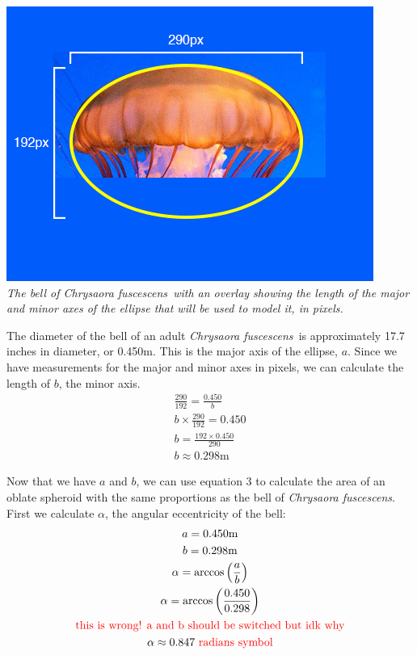 \documentclass[fleqn]{article}
\newcommand{\unit}[1]{\ensuremath{\mathrm{#1}}}
\newcommand\todo[1]{\textcolor{red}{#1}}
\newcommand\chry{\textit{Chrysaora fuscescens}}
\newcommand\chrys{\textit{Chrysaora fuscescens\ }}
\begin{document}
\includegraphics{chrysaora-fuscescens-cropped.png} \\
\textit{\small The bell of \chrys with an overlay showing the length of the major and minor axes of the ellipse that will be used to model it, in pixels.}

The diameter of the bell of an adult \chrys is approximately 17.7 inches in diameter, or 0.450m. This is the major axis of the ellipse, $a$. Since we have measurements for the major and minor axes in pixels, we can calculate the length of $b$, the minor axis.
\begin{gather*}
  \frac{290}{192} = \frac{0.450}{b} \\
  b \times \frac{290}{192} = 0.450 \\
  b = \frac{192 \times 0.450}{290} \\
  b \approx 0.298\unit{m}
\end{gather*}

Now that we have $a$ and $b$, we can use equation 3 to calculate the area of an oblate spheroid with the same proportions as the bell of \chry. First we calculate $\alpha$, the angular eccentricity of the bell:
\begin{gather*}
  a = 0.450\unit{m} \\
  b = 0.298\unit{m} \\
  \alpha=\arccos\left(\frac{a}{b}\right) \\
  \alpha=\arccos\left(\frac{0.450}{0.298}\right) \\
  \text{\todo{this is wrong! a and b should be switched but idk why}} \\
  \alpha \approx 0.847 \ \text{\todo{radians symbol}}
\end{gather*}
\end{document}
